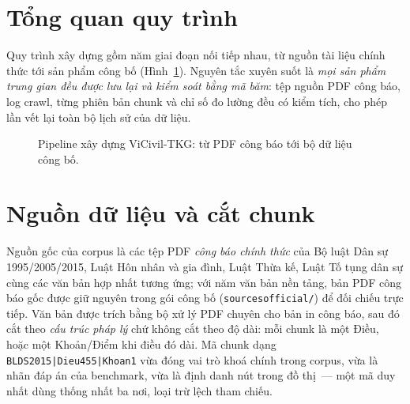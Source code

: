 \documentclass[12pt,a4paper]{report}
\renewcommand{\_}{\textunderscore\allowbreak}
\begin{document}
\section{Tổng quan quy trình}

Quy trình xây dựng gồm năm giai đoạn nối tiếp nhau, từ nguồn tài liệu chính thức tới sản phẩm công bố (Hình~\ref{fig:pipeline}). Nguyên tắc xuyên suốt là \emph{mọi sản phẩm trung gian đều được lưu lại và kiểm soát bằng mã băm}: tệp nguồn PDF công báo, log crawl, từng phiên bản chunk và chỉ số đo lường đều có kiểm tích, cho phép lần vết lại toàn bộ lịch sử của dữ liệu.

\begin{figure}[htbp]
\centering
{}
\caption{Pipeline xây dựng ViCivil-TKG: từ PDF công báo tới bộ dữ liệu công bố.}
\label{fig:pipeline}
\end{figure}

\section{Nguồn dữ liệu và cắt chunk}\label{sec:chunk}

Nguồn gốc của corpus là các tệp PDF \emph{công báo chính thức} của Bộ luật Dân sự 1995/2005/2015, Luật Hôn nhân và gia đình, Luật Thừa kế, Luật Tố tụng dân sự cùng các văn bản hợp nhất tương ứng; với năm văn bản nền tảng, bản PDF công báo gốc được giữ nguyên trong gói công bố (\texttt{sources\_official/}) để đối chiếu trực tiếp. Văn bản được trích bằng bộ xử lý PDF chuyên cho bản in công báo, sau đó cắt theo \emph{cấu trúc pháp lý} chứ không cắt theo độ dài: mỗi chunk là một Điều, hoặc một Khoản/Điểm khi điều đó dài. Mã chunk dạng \texttt{BLDS2015|Dieu455|Khoan1} vừa đóng vai trò khoá chính trong corpus, vừa là nhãn đáp án của benchmark, vừa là định danh nút trong đồ thị~--- một mã duy nhất dùng thống nhất ba nơi, loại trừ lệch tham chiếu.
\end{document}
